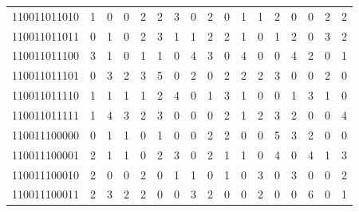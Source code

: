 \documentclass[10pt,a4paper]{article}
\begin{document}
\begin{longtable}{ |c|c|c|c|c|c|c|c|c|c|c|c|c|c|c|c|c| }
    110011011010              & 1                            & 0                                & 0                            & 2                              & 2   & 3   & 0   & 2   & 0   & 1   & 1   & 2   & 0   & 0   & 2   & 2   \\
    110011011011              & 0                            & 1                                & 0                            & 2                              & 3   & 1   & 1   & 2   & 2   & 1   & 0   & 1   & 2   & 0   & 3   & 2   \\
    110011011100              & 3                            & 1                                & 0                            & 1                              & 1   & 0   & 4   & 3   & 0   & 4   & 0   & 0   & 4   & 2   & 0   & 1   \\
    110011011101              & 0                            & 3                                & 2                            & 3                              & 5   & 0   & 2   & 0   & 2   & 2   & 2   & 3   & 0   & 0   & 2   & 0   \\
    110011011110              & 1                            & 1                                & 1                            & 1                              & 2   & 4   & 0   & 1   & 3   & 1   & 0   & 0   & 1   & 3   & 1   & 0   \\
    110011011111              & 1                            & 4                                & 3                            & 2                              & 3   & 0   & 0   & 0   & 2   & 1   & 2   & 3   & 2   & 0   & 0   & 4   \\
    110011100000              & 0                            & 1                                & 1                            & 0                              & 1   & 0   & 0   & 2   & 2   & 0   & 0   & 5   & 3   & 2   & 0   & 0   \\
    110011100001              & 2                            & 1                                & 1                            & 0                              & 2   & 3   & 0   & 2   & 1   & 1   & 0   & 4   & 0   & 4   & 1   & 3   \\
    110011100010              & 2                            & 0                                & 0                            & 2                              & 0   & 1   & 1   & 0   & 1   & 0   & 3   & 0   & 3   & 0   & 0   & 2   \\
    110011100011              & 2                            & 3                                & 2                            & 2                              & 0   & 0   & 3   & 2   & 0   & 0   & 2   & 0   & 0   & 6   & 0   & 1   \\

\end{longtable}
\end{document}
